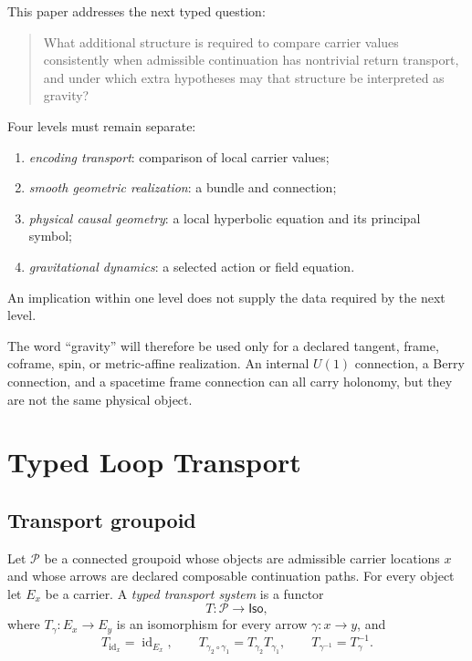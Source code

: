 \documentclass[11pt]{article}
\newcommand{\id}{\operatorname{id}}
\begin{document}
This paper addresses the next typed question:
\begin{quote}
What additional structure is required to compare carrier values consistently
when admissible continuation has nontrivial return transport, and under which
extra hypotheses may that structure be interpreted as gravity?
\end{quote}

Four levels must remain separate:
\begin{enumerate}
\item \emph{encoding transport}: comparison of local carrier values;
\item \emph{smooth geometric realization}: a bundle and connection;
\item \emph{physical causal geometry}: a local hyperbolic equation and its
principal symbol;
\item \emph{gravitational dynamics}: a selected action or field equation.
\end{enumerate}
An implication within one level does not supply the data required by the next
level.

The word ``gravity'' will therefore be used only for a declared tangent,
frame, coframe, spin, or metric-affine realization.  An internal $U(1)$
connection, a Berry connection, and a spacetime frame connection can all
carry holonomy, but they are not the same physical object.

\section{Typed Loop Transport}

\subsection{Transport groupoid}

\begin{definition}\label{def:transport}
Let $\mathcal P$ be a connected groupoid whose objects are admissible carrier
locations $x$ and whose arrows are declared composable continuation paths.
For every object let $E_x$ be a carrier.  A \emph{typed transport system} is a
functor
\[
 T:\mathcal P\longrightarrow \mathsf{Iso},
\]
where $T_\gamma:E_x\to E_y$ is an isomorphism for every arrow
$\gamma:x\to y$, and
\[
 T_{\id_x}=\id_{E_x},\qquad
 T_{\gamma_2\circ\gamma_1}=T_{\gamma_2}T_{\gamma_1},\qquad
 T_{\gamma^{-1}}=T_\gamma^{-1}.
\]
\end{definition}
\end{document}
